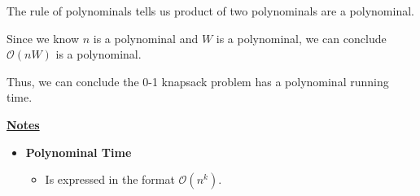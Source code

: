 \documentclass[12pt]{article}
\begin{document}
\begin{enumerate}[1.]
\begin{enumerate}[1.]
        \begin{mdframed}
        The rule of polynominals tells us product of two polynominals are a polynominal.

        Since we know $n$ is a polynominal and $W$ is a polynominal,
        we can conclude $\mathcal{O}(nW)$ is a polynominal.

        \bigskip

        Thus, we can conclude the 0-1 knapsack problem has a polynominal running time.

        \end{mdframed}

    \end{enumerate}

    \underline{\textbf{Notes}}

    \begin{itemize}
        \item \textbf{Polynominal Time}

        \begin{itemize}
            \item Is expressed in the format $\mathcal{O}(n^k)$.
        \end{itemize}
    \end{itemize}

\end{enumerate}
\end{document}

